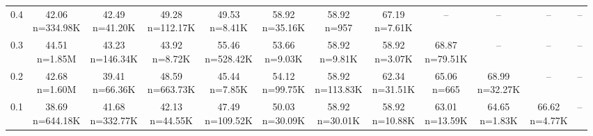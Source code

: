 \begin{table}
\begin{tabular}{lccccccccccc}
0.4 & \makecell{42.06 \\ \scriptsize n=334.98K} & \makecell{42.49 \\ \scriptsize n=41.20K} & \makecell{49.28 \\ \scriptsize n=112.17K} & \makecell{49.53 \\ \scriptsize n=8.41K} & \makecell{58.92 \\ \scriptsize n=35.16K} & \makecell{58.92 \\ \scriptsize n=957} & \makecell{67.19 \\ \scriptsize n=7.61K} & -- & -- & -- & -- \\
0.3 & \makecell{44.51 \\ \scriptsize n=1.85M} & \makecell{43.23 \\ \scriptsize n=146.34K} & \makecell{43.92 \\ \scriptsize n=8.72K} & \makecell{55.46 \\ \scriptsize n=528.42K} & \makecell{53.66 \\ \scriptsize n=9.03K} & \makecell{58.92 \\ \scriptsize n=9.81K} & \makecell{58.92 \\ \scriptsize n=3.07K} & \makecell{68.87 \\ \scriptsize n=79.51K} & -- & -- & -- \\
0.2 & \makecell{42.68 \\ \scriptsize n=1.60M} & \makecell{39.41 \\ \scriptsize n=66.36K} & \makecell{48.59 \\ \scriptsize n=663.73K} & \makecell{45.44 \\ \scriptsize n=7.85K} & \makecell{54.12 \\ \scriptsize n=99.75K} & \makecell{58.92 \\ \scriptsize n=113.83K} & \makecell{62.34 \\ \scriptsize n=31.51K} & \makecell{65.06 \\ \scriptsize n=665} & \makecell{68.99 \\ \scriptsize n=32.27K} & -- & -- \\
0.1 & \makecell{38.69 \\ \scriptsize n=644.18K} & \makecell{41.68 \\ \scriptsize n=332.77K} & \makecell{42.13 \\ \scriptsize n=44.55K} & \makecell{47.49 \\ \scriptsize n=109.52K} & \makecell{50.03 \\ \scriptsize n=30.09K} & \makecell{58.92 \\ \scriptsize n=30.01K} & \makecell{58.92 \\ \scriptsize n=10.88K} & \makecell{63.01 \\ \scriptsize n=13.59K} & \makecell{64.65 \\ \scriptsize n=1.83K} & \makecell{66.62 \\ \scriptsize n=4.77K} & -- \\

\end{tabular}
\end{table}
